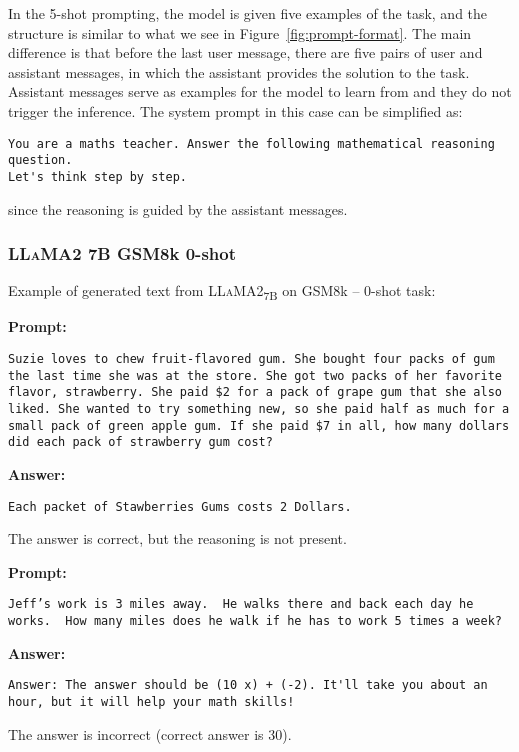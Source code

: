 In the 5-shot prompting, the model is given five examples of the task, and the structure is similar to what we see in Figure~\ref{fig:prompt-format}.
The main difference is that before the last user message, there are five pairs of user and assistant messages, in which the assistant provides the solution to the task.
Assistant messages serve as examples for the model to learn from and they do not trigger the inference.
The system prompt in this case can be simplified as:
\begin{Verbatim}[fontsize=\small,breaklines]
You are a maths teacher. Answer the following mathematical reasoning question.
Let's think step by step.
\end{Verbatim}
since the reasoning is guided by the assistant messages.

\subsubsection*{\textsc{LLaMA}2 7B GSM8k 0-shot}
\noindent Example of generated text from \textsc{LLaMA}2\textsubscript{7B} on GSM8k -- 0-shot task:
\begin{displayquote}
	\textbf{Prompt:}
	\begin{Verbatim}[fontsize=\small,breaklines]
Suzie loves to chew fruit-flavored gum. She bought four packs of gum the last time she was at the store. She got two packs of her favorite flavor, strawberry. She paid $2 for a pack of grape gum that she also liked. She wanted to try something new, so she paid half as much for a small pack of green apple gum. If she paid $7 in all, how many dollars did each pack of strawberry gum cost?
	\end{Verbatim}
	\textbf{Answer:}
	\begin{Verbatim}[fontsize=\small,breaklines]
Each packet of Stawberries Gums costs 2 Dollars.
	\end{Verbatim}
\end{displayquote}
The answer is correct, but the reasoning is not present.
\begin{displayquote}
	\textbf{Prompt:}
	\begin{Verbatim}[fontsize=\small,breaklines]
Jeff’s work is 3 miles away.  He walks there and back each day he works.  How many miles does he walk if he has to work 5 times a week?
	\end{Verbatim}
	\textbf{Answer:}
	\begin{Verbatim}[fontsize=\small,breaklines]
Answer: The answer should be (10 x) + (-2). It'll take you about an hour, but it will help your math skills!
	\end{Verbatim}
\end{displayquote}
The answer is incorrect (correct answer is 30).

